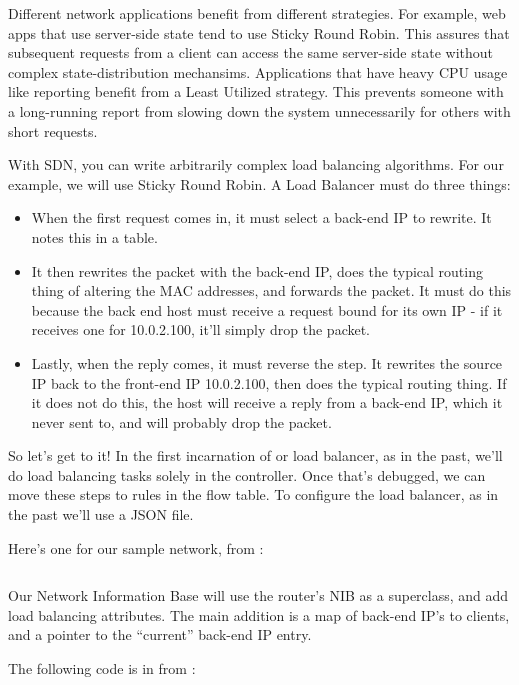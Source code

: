 Different network applications benefit from different strategies.  For example, web apps that
use server-side state tend to use Sticky Round Robin.  This assures that subsequent requests
from a client can access the same server-side state without complex state-distribution 
mechansims.  Applications that have heavy CPU usage like reporting benefit from a Least Utilized
strategy.  This prevents someone with a long-running report from slowing down the system 
unnecessarily for others with short requests.

With SDN, you can write arbitrarily complex load balancing algorithms.  For our example,
we will use Sticky Round Robin.  A Load Balancer must do three things:

\begin{itemize}
\item When the first request comes in, it must select a back-end IP to rewrite.  It notes this
in a table.
\item It then rewrites the packet with the back-end IP, does the typical routing thing of 
altering the MAC addresses, and forwards the packet.  It must do this because the back end host
must receive a request bound for its own IP - if it receives one for 10.0.2.100, it'll simply drop
the packet.
\item Lastly, when the reply comes, it must reverse the step.  It rewrites the source IP back to 
the front-end IP 10.0.2.100, then does the typical routing thing.   If it does not do this, the 
host will receive a reply from a back-end IP, which it never sent to, and will probably drop
the packet.  
\end{itemize}

So let's get to it!  In the first incarnation of or load balancer, as in the past, we'll 
do load balancing tasks solely in the controller.  Once that's debugged, we can move these
steps to rules in the flow table.  To configure the load balancer, as in the past
we'll use a JSON file.  

Here's one for our sample network, from :

\inputminted{python}{code/routing_variants/load_balancer.json}

Our Network Information Base will use the router's NIB as a 
superclass, and add load balancing attributes.   The main addition is a map of back-end IP's
to clients, and a pointer to the ``current'' back-end IP entry.  

The following code is in from :


